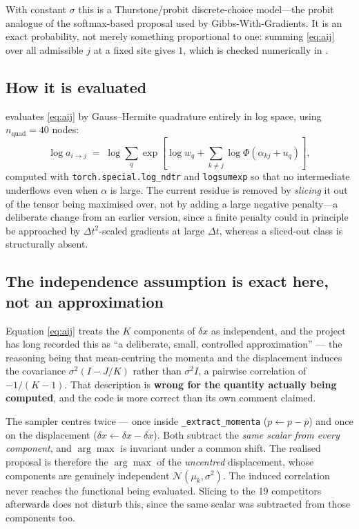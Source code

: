 \documentclass[11pt,a4paper]{article}
\newcommand{\dt}{\Delta t}
\begin{document}
With constant $\sigma$ this is a Thurstone/probit discrete-choice
model---the probit analogue of the softmax-based proposal used by
Gibbs-With-Gradients. It is an exact probability, not merely something
proportional to one: summing \eqref{eq:aij} over all admissible $j$ at a fixed
site gives $1$, which is checked numerically in
.

\subsection{How it is evaluated}

 evaluates \eqref{eq:aij} by Gauss--Hermite
quadrature entirely in log space, using $n_{\mathrm{quad}}=40$ nodes:
\begin{equation}
  \log a_{i\to j}
  \;=\; \log \sum_{q} \exp\!\left[
          \log w_{q} + \sum_{k \neq j} \log \Phi\!\left(\alpha_{kj} + u_{q}\right)
        \right],
\end{equation}
computed with \texttt{torch.special.log\_ndtr} and \texttt{logsumexp} so that
no intermediate underflows even when $\alpha$ is large. The current residue is
removed by \emph{slicing} it out of the tensor being maximised over, not by
adding a large negative penalty---a deliberate change from an earlier version,
since a finite penalty could in principle be approached by
$\dt^{2}$-scaled gradients at large $\dt$, whereas a sliced-out class is
structurally absent.

\subsection{The independence assumption is exact here, not an approximation}

Equation \eqref{eq:aij} treats the $K$ components of $\delta x$ as
independent, and the project has long recorded this as ``a deliberate, small,
controlled approximation'' --- the reasoning being that mean-centring the
momenta and the displacement induces the covariance $\sigma^{2}(I-J/K)$
rather than $\sigma^{2}I$, a pairwise correlation of $-1/(K-1)$. That
description is \textbf{wrong for the quantity actually being computed}, and
the code is more correct than its own comment claimed.

The sampler centres twice --- once inside \texttt{\_extract\_momenta}
($p \leftarrow p - \overline{p}$) and once on the displacement
($\delta x \leftarrow \delta x - \overline{\delta x}$). Both subtract the
\emph{same scalar from every component}, and $\arg\max$ is invariant under a
common shift. The realised proposal is therefore the $\arg\max$ of the
\emph{uncentred} displacement, whose components are genuinely independent
$\mathcal{N}(\mu_{k},\sigma^{2})$. The induced correlation never reaches the
functional being evaluated. Slicing to the 19 competitors afterwards does not
disturb this, since the same scalar was subtracted from those components too.
\end{document}
